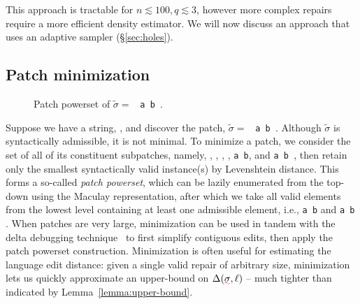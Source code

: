 \documentclass[sigplan,review,anonymous,acmsmall]{acmart}\settopmatter{printfolios=false,printccs=false,printacmref=false}
\begin{document}
\noindent This approach is tractable for $n \lesssim 100, q \lesssim 3$, however more complex repairs require a more efficient density estimator. We will now discuss an approach that uses an adaptive sampler (\S\ref{sec:holes}).

\subsection{Patch minimization}

\begin{figure}
  \vspace{-14pt}
  \caption{Patch powerset of $\tilde{\sigma}=$ \texttt{\hlgreen{(} a \hlorange{+} b \hlgreen{)}}.}
\end{figure}

Suppose we have a string, \texttt{}, and discover the patch, $\tilde{\sigma}=$ \texttt{\hlgreen{(} a \hlorange{+} b \hlgreen{)}}. Although $\tilde{\sigma}$ is syntactically admissible, it is not minimal. To minimize a patch, we consider the set of all of its constituent subpatches, namely, \texttt{}, \texttt{}, \texttt{}, \texttt{}, \texttt{a \hlorange{+} b}, and \texttt{a \hlgreen{(} b \hlgreen{)}}, then retain only the smallest syntactically valid instance(s) by Levenshtein distance. This forms a so-called \textit{patch powerset}, which can be lazily enumerated from the top-down using the Maculay representation, after which we take all valid elements from the lowest level containing at least one admissible element, i.e., \texttt{a \hlorange{+} b} and \texttt{a \hlgreen{(} b \hlgreen{)}}. When patches are very large, minimization can be used in tandem with the delta debugging technique~\cite{zeller2002isolating} to first simplify contiguous edits, then apply the patch powerset construction. Minimization is often useful for estimating the language edit distance: given a single valid repair of arbitrary size, minimization lets us quickly approximate an upper-bound on $\Delta(\err{\sigma}, \ell)$ -- much tighter than indicated by Lemma~\ref{lemma:upper-bound}.
\end{document}
